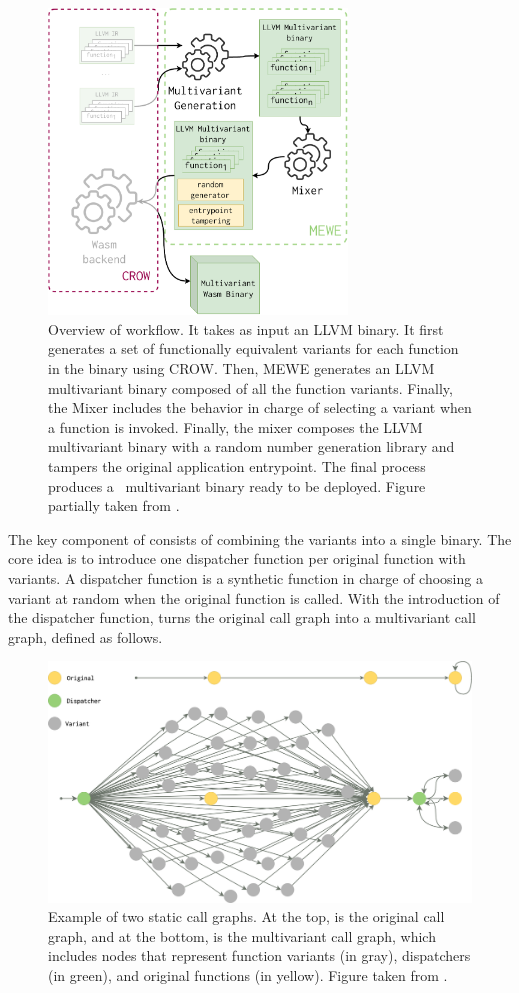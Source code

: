 \begin{figure}
  \centering
  \includegraphics[height=3.2in]{diagrams/MEWE.pdf}
  \caption{Overview of \tool workflow. It takes as input an LLVM binary. It first generates a set of functionally equivalent variants for each function in the binary using CROW. Then, MEWE generates an LLVM multivariant binary composed of all the function variants. Finally, the Mixer includes the behavior in charge of selecting a variant when a function is invoked. Finally, the \tool mixer composes the LLVM multivariant binary with a random number generation library and tampers the original application entrypoint. The final process produces a \wasm\ multivariant binary ready to be deployed. Figure partially taken from \cite{Lic}. }
  \label{workflow}
\end{figure}


 


The key component of \tool consists of combining the variants into a single binary.
The core idea is to introduce one dispatcher function per original function with variants.
A dispatcher function is a synthetic function in charge of choosing a variant at random when the original function is called.
With the introduction of the dispatcher function,  \tool turns the original call graph into a multivariant call graph, defined as follows. 


\begin{figure}
    \centering
  \includegraphics[width=.8\linewidth]{diagrams/CFG.png}
  \caption{Example of two static call graphs. At the top, is the original call graph, and at the bottom, is the multivariant call graph, which includes nodes that represent function variants (in gray), dispatchers (in green), and original functions  (in yellow). Figure taken from \cite{Lic}.
}
  \label{multivariant}
\end{figure}

